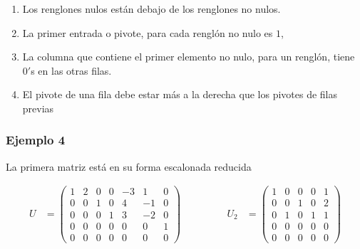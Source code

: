 \documentclass[
]{article}
\begin{document}
\begin{enumerate}
\def\labelenumi{\arabic{enumi})}
\item
  Los renglones nulos están debajo de los renglones no nulos.
\item
  La primer entrada o pivote, para cada renglón no nulo es \(1\),
\item
  La columna que contiene el primer elemento no nulo, para un renglón,
  tiene \(0'\)s en las otras filas.
\item
  El pivote de una fila debe estar más a la derecha que los pivotes de
  filas previas
\end{enumerate}

\hypertarget{ejemplo-4-1}{%
\subsubsection{Ejemplo 4}\label{ejemplo-4-1}}

La primera matriz está en su forma escalonada reducida

\begin{equation*}
 \begin{array}{ccccc}
   U & = \begin{pmatrix}
                                  1   &   2 &   0  & 0 & -3 &  1  & 0   \\
                                  0   &   0 &   1  & 0 &  4 & -1  & 0   \\
                                  0   &   0 &   0  & 1 &  3 & -2  & 0   \\
                                  0   &   0 &   0  & 0 &  0 &  0  & 1   \\
                                  0   &   0 &   0  & 0 &  0 &  0  & 0   
                                \end{pmatrix} & \quad\quad\quad
    & U_2 &= \begin{pmatrix}
                                  1   &   0 &   0  & 0 &  1    \\
                                  0   &   0 &   1  & 0 &  2   \\
                                  0   &   1 &   0  & 1 &  1    \\
                                  0   &   0 &   0  & 0 &  0    \\
                                  0   &   0 &   0  & 0 &  0 
                                \end{pmatrix}
 \end{array}
\end{equation*}
\end{document}
